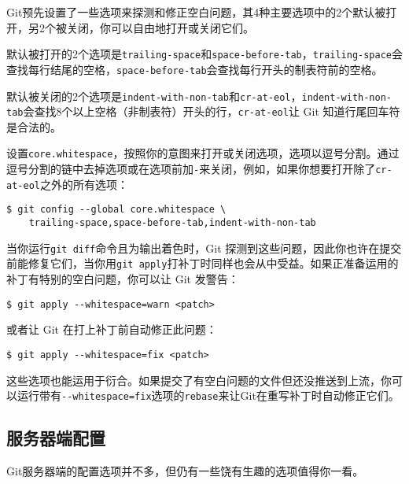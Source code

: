 \documentclass[a4paper]{book}
\newcounter{tab}[chapter]
\begin{document}
Git预先设置了一些选项来探测和修正空白问题，其4种主要选项中的2个默认被打开，另2个被关闭，你可以自由地打开或关闭它们。

默认被打开的2个选项是\texttt{trailing-space}和\texttt{space-before-tab}，\texttt{trailing-space}会查找每行结尾的空格，\texttt{space-before-tab}会查找每行开头的制表符前的空格。

默认被关闭的2个选项是\texttt{indent-with-non-tab}和\texttt{cr-at-eol}，\texttt{indent-with-non-tab}会查找8个以上空格（非制表符）开头的行，\texttt{cr-at-eol}让 Git 知道行尾回车符是合法的。

设置\texttt{core.whitespace}，按照你的意图来打开或关闭选项，选项以逗号分割。通过逗号分割的链中去掉选项或在选项前加\texttt{-}来关闭，例如，如果你想要打开除了\texttt{cr-at-eol}之外的所有选项：

\begin{shaded}\begin{verbatim}
$ git config --global core.whitespace \
    trailing-space,space-before-tab,indent-with-non-tab
\end{verbatim}\end{shaded}

当你运行\texttt{git diff}命令且为输出着色时，Git 探测到这些问题，因此你也许在提交前能修复它们，当你用\texttt{git apply}打补丁时同样也会从中受益。如果正准备运用的补丁有特别的空白问题，你可以让 Git 发警告：

\begin{shaded}\begin{verbatim}
$ git apply --whitespace=warn <patch>
\end{verbatim}\end{shaded}

或者让 Git 在打上补丁前自动修正此问题：

\begin{shaded}\begin{verbatim}
$ git apply --whitespace=fix <patch>
\end{verbatim}\end{shaded}

这些选项也能运用于衍合。如果提交了有空白问题的文件但还没推送到上流，你可以运行带有\texttt{-{}-whitespace=fix}选项的\texttt{rebase}来让Git在重写补丁时自动修正它们。

\subsection{服务器端配置}

Git服务器端的配置选项并不多，但仍有一些饶有生趣的选项值得你一看。
\end{document}
